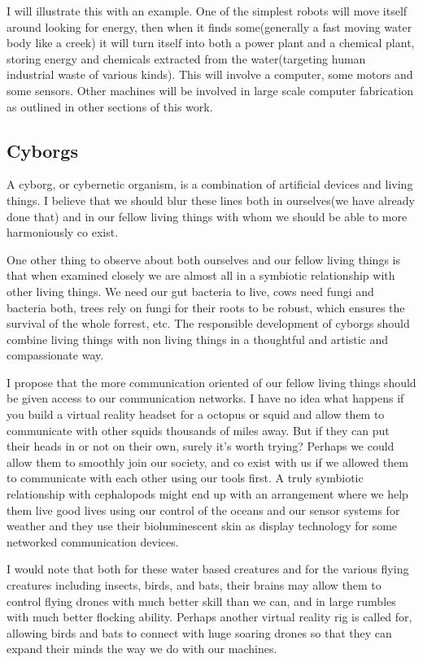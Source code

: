\documentclass[11pt]{article}
\begin{document}
I will illustrate this with an example. One of the simplest robots will
move itself around looking for energy, then when it finds some(generally
a fast moving water body like a creek) it will turn itself into both a
power plant and a chemical plant, storing energy and chemicals extracted
from the water(targeting human industrial waste of various kinds). This
will involve a computer, some motors and some sensors. Other machines
will be involved in large scale computer fabrication as outlined in
other sections of this work.

\subsection{Cyborgs}\label{cyborgs}

A cyborg, or cybernetic organism, is a combination of artificial devices
and living things. I believe that we should blur these lines both in
ourselves(we have already done that) and in our fellow living things
with whom we should be able to more harmoniously co exist.

One other thing to observe about both ourselves and our fellow living
things is that when examined closely we are almost all in a symbiotic
relationship with other living things. We need our gut bacteria to live,
cows need fungi and bacteria both, trees rely on fungi for their roots
to be robust, which ensures the survival of the whole forrest, etc. The
responsible development of cyborgs should combine living things with non
living things in a thoughtful and artistic and compassionate way.

I propose that the more communication oriented of our fellow living
things should be given access to our communication networks. I have no
idea what happens if you build a virtual reality headset for a octopus
or squid and allow them to communicate with other squids thousands of
miles away. But if they can put their heads in or not on their own,
surely it's worth trying? Perhaps we could allow them to smoothly join
our society, and co exist with us if we allowed them to communicate with
each other using our tools first. A truly symbiotic relationship with
cephalopods might end up with an arrangement where we help them live
good lives using our control of the oceans and our sensor systems for
weather and they use their bioluminescent skin as display technology for
some networked communication devices.

I would note that both for these water based creatures and for the
various flying creatures including insects, birds, and bats, their
brains may allow them to control flying drones with much better skill
than we can, and in large rumbles with much better flocking ability.
Perhaps another virtual reality rig is called for, allowing birds and
bats to connect with huge soaring drones so that they can expand their
minds the way we do with our machines.
\end{document}
